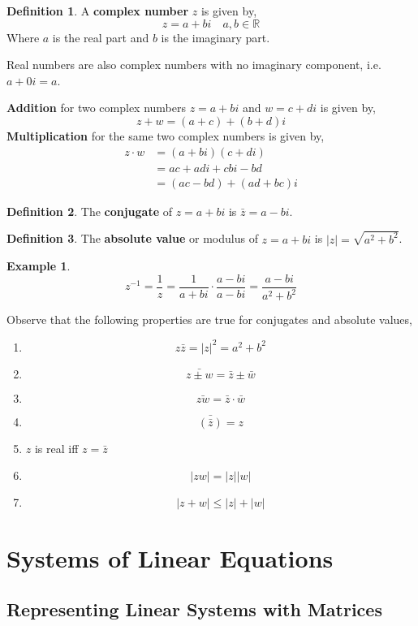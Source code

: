 \documentclass{report}
\theoremstyle{definition}
\newtheorem*{_def}{Definition}
\newtheorem{ex}{Example}[section]
\theoremstyle{remark}
\begin{document}
\begin{_def}
A \textbf{complex number} $z$ is given by,
\[z=a+bi \quad a,b\in \mathbb{R}\]
Where $a$ is the real part and $b$ is the imaginary part.
\end{_def}

Real numbers are also complex numbers with no imaginary component, i.e. $a+0i=a$. \newline

\textbf{Addition} for two complex numbers $z=a+bi$ and $w=c+di$ is given by,
\[z+w=(a+c)+(b+d)i\]
\textbf{Multiplication} for the same two complex numbers is given by,
\begin{align*}
z\cdot w &= (a+bi)(c+di) \\
&= ac+adi+cbi-bd \\
&= (ac-bd)+(ad+bc)i
\end{align*}

\begin{_def}
The \textbf{conjugate} of $z=a+bi$ is $\bar{z}=a-bi$.
\end{_def}

\begin{_def}
The \textbf{absolute value} or modulus of $z=a+bi$ is $|z|=\sqrt{a^2+b^2}$.
\end{_def}

\begin{ex}
\[z^{-1}=\frac{1}{z}=\frac{1}{a+bi}\cdot\frac{a-bi}{a-bi}=\frac{a-bi}{a^2+b^2}\]
\end{ex}

Observe that the following properties are true for conjugates and absolute values,
\begin{enumerate}
 \item \[z\bar{z}=|z|^2=a^2+b^2\]
 \item \[\bar{z\pm w}=\bar{z}\pm \bar{w}\]
 \item \[\bar{zw}=\bar{z}\cdot \bar{w}\]
 \item \[\bar{(\bar{z})}=z\]
 \item $z$ is real iff $z=\bar{z}$
 \item \[|zw|=|z||w|\]
 \item \[|z+w|\leq |z|+|w|\]
\end{enumerate}

\chapter{Systems of Linear Equations}

\section{Representing Linear Systems with Matrices}
\end{document}
